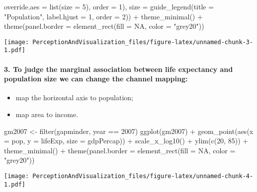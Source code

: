 \documentclass[
]{article}
\newenvironment{Shaded}{\begin{snugshade}}{\end{snugshade}}
\newcommand{\AttributeTok}[1]{\textcolor[rgb]{0.77,0.63,0.00}{#1}}
\newcommand{\ConstantTok}[1]{\textcolor[rgb]{0.00,0.00,0.00}{#1}}
\newcommand{\DecValTok}[1]{\textcolor[rgb]{0.00,0.00,0.81}{#1}}
\newcommand{\FunctionTok}[1]{\textcolor[rgb]{0.00,0.00,0.00}{#1}}
\newcommand{\NormalTok}[1]{#1}
\newcommand{\OtherTok}[1]{\textcolor[rgb]{0.56,0.35,0.01}{#1}}
\newcommand{\SpecialCharTok}[1]{\textcolor[rgb]{0.00,0.00,0.00}{#1}}
\newcommand{\StringTok}[1]{\textcolor[rgb]{0.31,0.60,0.02}{#1}}
\providecommand{\tightlist}{%
  \setlength{\itemsep}{0pt}\setlength{\parskip}{0pt}}
\begin{document}
\begin{Shaded}
\begin{Highlighting}[]
                             \AttributeTok{override.aes =} \FunctionTok{list}\NormalTok{(}\AttributeTok{size =} \DecValTok{5}\NormalTok{), }\AttributeTok{order =} \DecValTok{1}\NormalTok{),}
         \AttributeTok{size =} \FunctionTok{guide\_legend}\NormalTok{(}\AttributeTok{title =} \StringTok{"Population"}\NormalTok{,}
                             \AttributeTok{label.hjust =} \DecValTok{1}\NormalTok{,}
                             \AttributeTok{order =} \DecValTok{2}\NormalTok{)) }\SpecialCharTok{+} 
  \FunctionTok{theme\_minimal}\NormalTok{() }\SpecialCharTok{+} 
  \FunctionTok{theme}\NormalTok{(}\AttributeTok{panel.border =} \FunctionTok{element\_rect}\NormalTok{(}\AttributeTok{fill =} \ConstantTok{NA}\NormalTok{, }\AttributeTok{color =} \StringTok{"grey20"}\NormalTok{))}
\end{Highlighting}
\end{Shaded}

\texttt{[image: PerceptionAndVisualization\_files/figure-latex/unnamed-chunk-3-1.pdf]}

\hypertarget{to-judge-the-marginal-association-between-life-expectancy-and-population-size-we-can-change-the-channel-mapping}{%
\paragraph{3. To judge the marginal association between life expectancy
and population size we can change the channel
mapping:}\label{to-judge-the-marginal-association-between-life-expectancy-and-population-size-we-can-change-the-channel-mapping}}

\begin{itemize}
\tightlist
\item
  map the horizontal axis to population;
\item
  map area to income.
\end{itemize}

\begin{Shaded}
\begin{Highlighting}[]
\NormalTok{gm2007 }\OtherTok{\textless{}{-}} \FunctionTok{filter}\NormalTok{(gapminder, year }\SpecialCharTok{==} \DecValTok{2007}\NormalTok{)}
\FunctionTok{ggplot}\NormalTok{(gm2007) }\SpecialCharTok{+}
  \FunctionTok{geom\_point}\NormalTok{(}\FunctionTok{aes}\NormalTok{(}\AttributeTok{x =}\NormalTok{ pop,}
                 \AttributeTok{y =}\NormalTok{ lifeExp,}
                 \AttributeTok{size =}\NormalTok{ gdpPercap)) }\SpecialCharTok{+}
  \FunctionTok{scale\_x\_log10}\NormalTok{() }\SpecialCharTok{+}
  \FunctionTok{ylim}\NormalTok{(}\FunctionTok{c}\NormalTok{(}\DecValTok{20}\NormalTok{, }\DecValTok{85}\NormalTok{)) }\SpecialCharTok{+}
  \FunctionTok{theme\_minimal}\NormalTok{() }\SpecialCharTok{+}
  \FunctionTok{theme}\NormalTok{(}\AttributeTok{panel.border =} \FunctionTok{element\_rect}\NormalTok{(}\AttributeTok{fill =} \ConstantTok{NA}\NormalTok{,}
                                    \AttributeTok{color =} \StringTok{"grey20"}\NormalTok{))}
\end{Highlighting}
\end{Shaded}

\texttt{[image: PerceptionAndVisualization\_files/figure-latex/unnamed-chunk-4-1.pdf]}
\end{document}
